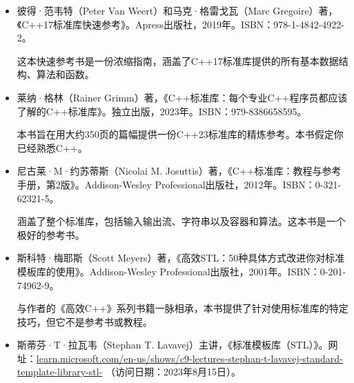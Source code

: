 
\begin{itemize}
\item
彼得·范韦特（Peter Van Weert）和马克·格雷戈瓦（Marc Gregoire）著，《C++17标准库快速参考》。Apress出版社，2019年。ISBN：978-1-4842-4922-2。

\hspace*{\fill}

这本快速参考书是一份浓缩指南，涵盖了C++17标准库提供的所有基本数据结构、算法和函数。

\hspace*{\fill}

\item
莱纳·格林（Rainer Grimm）著，《C++标准库：每个专业C++程序员都应该了解的C++标准库》。独立出版，2023年。ISBN：979-8386658595。

\hspace*{\fill}

本书旨在用大约350页的篇幅提供一份C++23标准库的精炼参考。本书假定你已经熟悉C++。

\hspace*{\fill}

\item
尼古莱·M·约苏蒂斯（Nicolai M. Josuttis）著，《C++标准库：教程与参考手册，第2版》。Addison-Wesley Professional出版社，2012年。ISBN：0-321-62321-5。

\hspace*{\fill}

涵盖了整个标准库，包括输入输出流、字符串以及容器和算法。这本书是一个极好的参考书。

\hspace*{\fill}

\item
斯科特·梅耶斯（Scott Meyers）著，《高效STL：50种具体方式改进你对标准模板库的使用》。Addison-Wesley Professional出版社，2001年。ISBN：0-201-74962-9。

\hspace*{\fill}

与作者的《高效C++》系列书籍一脉相承，本书提供了针对使用标准库的特定技巧，但它不是参考书或教程。

\hspace*{\fill}

\item
斯蒂芬·T·拉瓦韦（Stephan T. Lavavej）主讲，《标准模板库（STL）》。网址：\url{learn.microsoft.com/en-us/shows/c9-lectures-stephan-t-lavavej-standard-template-library-stl-} （访问日期：2023年8月15日）。


\end{itemize}
